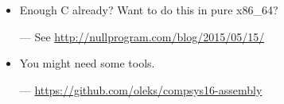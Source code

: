 \begin{frame}

\begin{itemize}

\item Enough C already? Want to do this in pure x86\_64?

--- See \url{http://nullprogram.com/blog/2015/05/15/}

\item You might need some tools.

--- \url{https://github.com/oleks/compsys16-assembly}

\end{itemize}

\end{frame}
